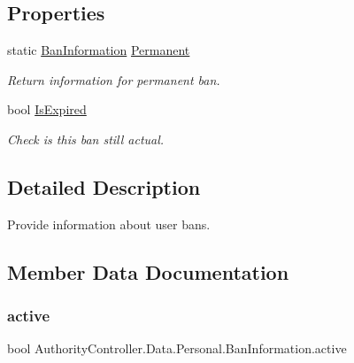 \subsection*{Properties}
\begin{DoxyCompactItemize}
\item 
static \mbox{\hyperlink{struct_authority_controller_1_1_data_1_1_personal_1_1_ban_information}{Ban\+Information}} \mbox{\hyperlink{struct_authority_controller_1_1_data_1_1_personal_1_1_ban_information_a129ecfe581f8d778a6b71cd13b7e8b77}{Permanent}}
\begin{DoxyCompactList}\small\item\em Return information for permanent ban. \end{DoxyCompactList}\item 
bool \mbox{\hyperlink{struct_authority_controller_1_1_data_1_1_personal_1_1_ban_information_ad07cbe220f0625c0b22183d764709d74}{Is\+Expired}}
\begin{DoxyCompactList}\small\item\em Check is this ban still actual. \end{DoxyCompactList}\end{DoxyCompactItemize}


\subsection{Detailed Description}
Provide information about user bans. 



\subsection{Member Data Documentation}
\mbox{\label{struct_authority_controller_1_1_data_1_1_personal_1_1_ban_information_a8aa7fea19a5b2acce008883fcda629b2}} 
\subsubsection{\texorpdfstring{active}{active}}
{\footnotesize\ttfamily bool Authority\+Controller.\+Data.\+Personal.\+Ban\+Information.\+active}



